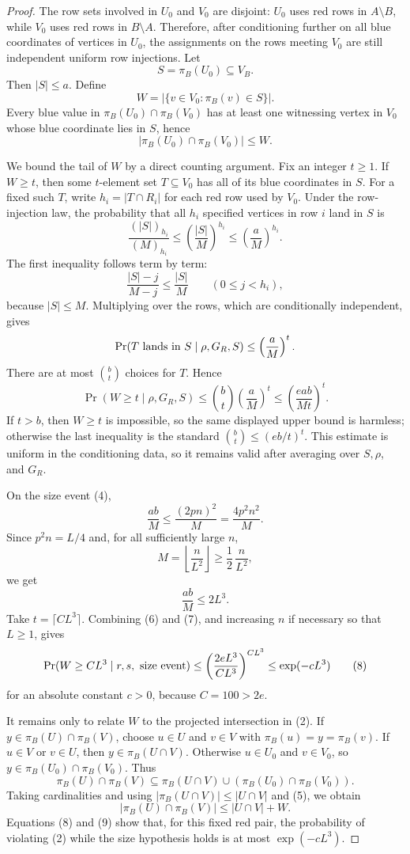 \begin{proof}
The row sets involved in \(U_0\) and \(V_0\) are disjoint: \(U_0\) uses red
rows in \(A\setminus B\), while \(V_0\) uses red rows in \(B\setminus A\).
Therefore, after conditioning further on all blue coordinates of vertices in
\(U_0\), the assignments on the rows meeting \(V_0\) are still independent
uniform row injections.  Let
\[
S=\pi_B(U_0)\subseteq V_B.
\]
Then \(|S|\le a\).  Define
\[
W=\bigl|\{v\in V_0:\pi_B(v)\in S\}\bigr|.
\]
Every blue value in \(\pi_B(U_0)\cap\pi_B(V_0)\) has at least one witnessing
vertex in \(V_0\) whose blue coordinate lies in \(S\), hence
\[
|\pi_B(U_0)\cap\pi_B(V_0)|\le W. \tag{5}
\]

We bound the tail of \(W\) by a direct counting argument.  Fix an integer
\(t\ge1\).  If \(W\ge t\), then some \(t\)-element set
\(T\subseteq V_0\) has all of its blue coordinates in \(S\).  For a fixed
such \(T\), write \(h_i=|T\cap R_i|\) for each red row used by \(V_0\).  Under
the row-injection law, the probability that all \(h_i\) specified vertices in
row \(i\) land in \(S\) is
\[
\frac{(|S|)_{h_i}}{(M)_{h_i}}
\le \left(\frac{|S|}{M}\right)^{h_i}
\le \left(\frac{a}{M}\right)^{h_i}.
\]
The first inequality follows term by term:
\[
\frac{|S|-j}{M-j}\le \frac{|S|}{M}\qquad (0\le j<h_i),
\]
because \(|S|\le M\).  Multiplying over the rows, which are conditionally
independent, gives
\[
\Pr(T\hbox{ lands in }S\mid \rho,G_R,S)
\le \left(\frac{a}{M}\right)^t .
\]
There are at most \(\binom bt\) choices for \(T\).  Hence
\[
\Pr(W\ge t\mid \rho,G_R,S)
\le \binom bt\left(\frac{a}{M}\right)^t
\le \left(\frac{eab}{Mt}\right)^t . \tag{6}
\]
If \(t>b\), then \(W\ge t\) is impossible, so the same displayed upper bound
is harmless; otherwise the last inequality is the standard
\(\binom bt\le(eb/t)^t\).
This estimate is uniform in the conditioning data, so it remains valid after
averaging over \(S,\rho\), and \(G_R\).

On the size event (4),
\[
\frac{ab}{M}
\le \frac{(2pn)^2}{M}
= \frac{4p^2n^2}{M}.
\]
Since \(p^2n=L/4\) and, for all sufficiently large \(n\),
\[
M=\left\lfloor\frac n{L^2}\right\rfloor
\ge \frac12\,\frac n{L^2},
\]
we get
\[
\frac{ab}{M}\le 2L^3. \tag{7}
\]
Take \(t=\lceil C L^3\rceil\).  Combining (6) and (7), and increasing \(n\)
if necessary so that \(L\ge1\), gives
\[
\Pr(W\ge C L^3\mid r,s,\hbox{ size event})
\le
\left(\frac{2eL^3}{C L^3}\right)^{C L^3}
\le \exp(-cL^3)
\tag{8}
\]
for an absolute constant \(c>0\), because \(C=100>2e\).

It remains only to relate \(W\) to the projected intersection in (2).  If
\(y\in\pi_B(U)\cap\pi_B(V)\), choose \(u\in U\) and \(v\in V\) with
\(\pi_B(u)=y=\pi_B(v)\).  If \(u\in V\) or \(v\in U\), then
\(y\in\pi_B(U\cap V)\).  Otherwise \(u\in U_0\) and \(v\in V_0\), so
\(y\in\pi_B(U_0)\cap\pi_B(V_0)\).  Thus
\[
\pi_B(U)\cap\pi_B(V)
\subseteq
\pi_B(U\cap V)\cup(\pi_B(U_0)\cap\pi_B(V_0)).
\]
Taking cardinalities and using \(|\pi_B(U\cap V)|\le |U\cap V|\) and (5),
we obtain
\[
|\pi_B(U)\cap\pi_B(V)|
\le |U\cap V|+W. \tag{9}
\]
Equations (8) and (9) show that, for this fixed red pair, the probability of
violating (2) while the size hypothesis holds is at most \(\exp(-cL^3)\).


\end{proof}
